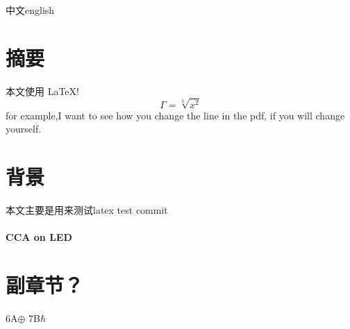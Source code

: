 \documentclass{article}
\begin{document}
	中文english
	\section{摘要}
	本文使用 \LaTeX!  $$ \Gamma=\sqrt[3]{x^2} $$
	for example,I want to see how you change the line in the pdf, if you will change yourself.
	\section{背景}
	本文主要是用来测试latex
	test commit
	\paragraph{CCA on LED}\section*{副章节？}
	6A$\oplus$ 7B$\hbar$
\end{document}
